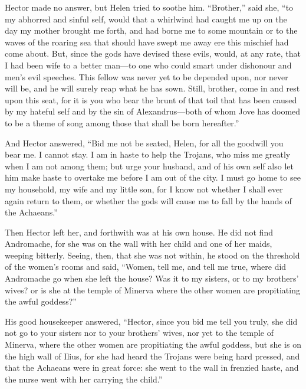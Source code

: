 Hector made no answer, but Helen tried to soothe him. “Brother,” said she,
“to my abhorred and sinful self, would that a whirlwind had caught me up
on the day my mother brought me forth, and had borne me to some mountain
or to the waves of the roaring sea that should have swept me away ere this
mischief had come about. But, since the gods have devised these evils,
would, at any rate, that I had been wife to a better man—to one who
could smart under dishonour and men’s evil speeches. This fellow was never
yet to be depended upon, nor never will be, and he will surely reap what
he has sown. Still, brother, come in and rest upon this seat, for it is
you who bear the brunt of that toil that has been caused by my hateful
self and by the sin of Alexandrus—both of whom Jove has doomed to be
a theme of song among those that shall be born hereafter.”

And Hector answered, “Bid me not be seated, Helen, for all the goodwill
you bear me. I cannot stay. I am in haste to help the Trojans, who miss me
greatly when I am not among them; but urge your husband, and of his own
self also let him make haste to overtake me before I am out of the city. I
must go home to see my household, my wife and my little son, for I know
not whether I shall ever again return to them, or whether the gods will
cause me to fall by the hands of the Achaeans.”

Then Hector left her, and forthwith was at his own house. He did not find
Andromache, for she was on the wall with her child and one of her maids,
weeping bitterly. Seeing, then, that she was not within, he stood on the
threshold of the women’s rooms and said, “Women, tell me, and tell me
true, where did Andromache go when she left the house? Was it to my
sisters, or to my brothers’ wives? or is she at the temple of Minerva
where the other women are propitiating the awful goddess?”

His good housekeeper answered, “Hector, since you bid me tell you truly,
she did not go to your sisters nor to your brothers’ wives, nor yet to the
temple of Minerva, where the other women are propitiating the awful
goddess, but she is on the high wall of Ilius, for she had heard the
Trojans were being hard pressed, and that the Achaeans were in great
force: she went to the wall in frenzied haste, and the nurse went with her
carrying the child.”


